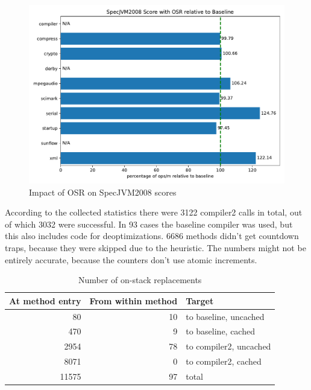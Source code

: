 \documentclass[draft,final]{vutinfth} %
\begin{document}
    \begin{figure}
        \centering
        \includegraphics[width=\textwidth]{../evaluation/specjvm/plots/plot_normalized_grouped}
        \caption{Impact of OSR on SpecJVM2008 scores}
        \label{fig:spec-relative}
    \end{figure}

    According to the collected statistics
    there were 3122 compiler2 calls in total,
    out of which 3032 were successful.
    In 93 cases the baseline compiler was used,
    but this also includes code for deoptimizations.
    6686 methods didn't get countdown traps,
    because they were skipped due to the heuristic.
    The numbers might not be entirely accurate,
    because the counters don't use atomic increments.


    \begin{table}
        \centering
        \begin{tabular}{rrl}
            \toprule
            \textbf{At method entry} & \textbf{From within method} & \textbf{Target}        \\
            \midrule
            80                       & 10                          & to baseline, uncached  \\
            470                      & 9                           & to baseline, cached    \\
            \midrule
            2954                     & 78                          & to compiler2, uncached \\
            8071                     & 0                           & to compiler2, cached   \\
            \midrule
            11575                    & 97                          & total                  \\
            \bottomrule
        \end{tabular}
        \caption{Number of on-stack replacements}
        \label{tab:osr-counts}
    \end{table}
\end{document}
